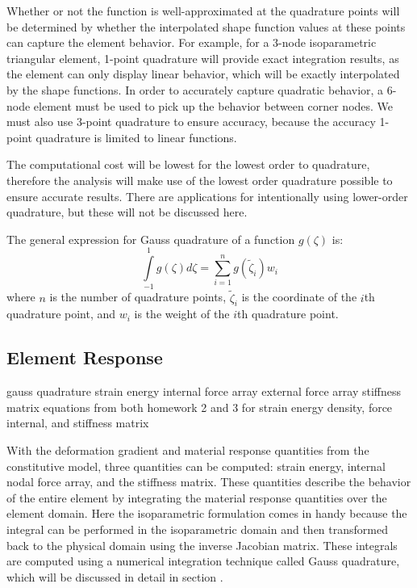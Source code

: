 \documentclass[]{spie}  %
\begin{document}
Whether or not the function is well-approximated at the quadrature points will be determined by whether the interpolated shape function values at these points can capture the element behavior. For example, for a 3-node isoparametric triangular element, 1-point quadrature will provide exact integration results, as the element can only display linear behavior, which will be exactly interpolated by the shape functions. In order to accurately capture quadratic behavior, a 6-node element must be used to pick up the behavior between corner nodes. We must also use 3-point quadrature to ensure accuracy, because the accuracy 1-point quadrature is limited to linear functions.

The computational cost will be lowest for the lowest order to quadrature, therefore the analysis will make use of the lowest order quadrature possible to ensure accurate results. There are applications for intentionally using lower-order quadrature, but these will not be discussed here.

The general expression for Gauss quadrature of a function $g(\zeta)$ is:
\begin{equation}
\label{eq: Gauss quadrature general}
\int\limits_{-1}^{1} g(\zeta)d\zeta = \sum\limits_{i=1}^{n} g(\tilde{\zeta}_i) w_i
\end{equation}
where $n$ is the number of quadrature points, $\tilde{\zeta}_i$ is the coordinate of the $i$th quadrature point, and $w_i$ is the weight of the $i$th quadrature point. 

\subsection{Element Response}
\label{sec: element response}
gauss quadrature
strain energy
internal force array
external force array
stiffness matrix
equations from both homework 2 and 3 for strain energy density, force internal, and stiffness matrix


With the deformation gradient and material response quantities from the constitutive model, three quantities can be computed: strain energy, internal nodal force array, and the stiffness matrix. These quantities describe the behavior of the entire element by integrating the material response quantities over the element domain. Here the isoparametric formulation comes in handy because the integral can be performed in the isoparametric domain and then transformed back to the physical domain using the inverse Jacobian matrix. These integrals are computed using a numerical integration technique called Gauss quadrature, which will be discussed in detail in section \textit{}. 
\end{document}
